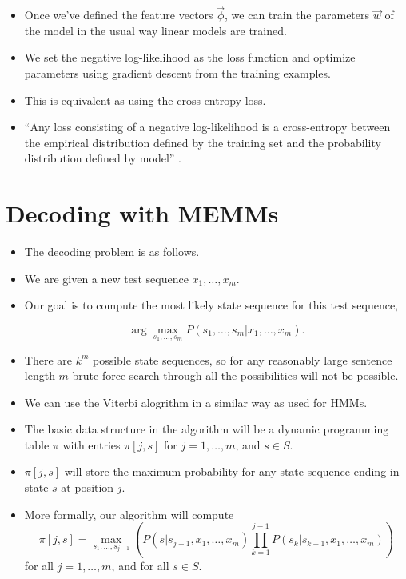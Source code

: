 \begin{itemize}

\item Once we've defined the feature vectors $\vec{\phi}$, we can train the parameters $\vec{w}$ of the model in the usual way linear models are trained.

\item We set the negative log-likelihood as the loss function and optimize parameters using gradient descent from the training examples.

\item This is equivalent as using the cross-entropy loss.

\item ``Any loss consisting of a negative log-likelihood is a cross-entropy between the empirical distribution defined by the training set and the probability distribution defined by model'' \cite{goodfellow2016deep}.  
 
\end{itemize}


\section{Decoding with MEMMs}

\begin{itemize}

\item The decoding problem is as follows.
\item We are given a new test sequence $x_1, \dots, x_m$.
\item Our goal is to compute the most likely state sequence for this test sequence,

\begin{equation}
 \operatorname{arg} \max_{s_1,\dots,s_m} P(s_1,\dots,s_m|x_1,\dots,x_m).
\end{equation}

\item There are $k^m$ possible state sequences, so for any reasonably large sentence length $m$ brute-force search through all the possibilities will not be possible.

\item We can use the Viterbi alogrithm in a similar way as used for HMMs.
 
\item The basic data structure in the algorithm will be a dynamic programming table $\pi$ with entries $\pi[j,s]$ for $j=1, \dots, m$, and $s \in S$.

\item  $\pi[j,s]$ will store the maximum probability for any state sequence ending in state $s$ at position $j$.

\item More formally, our algorithm will compute 
\begin{displaymath}
\pi[j,s] =  \max_{s_1,\dots, s_{j-1}}\left(P(s | s_{j-1}, x_1, \dots, x_m) \prod_{k=1}^{j-1}    P(s_k | s_{k-1}, x_1, \dots, x_m)\right)
\end{displaymath}
for all $j = 1, \dots,m$, and for all $s \in S$.

\end{itemize}

